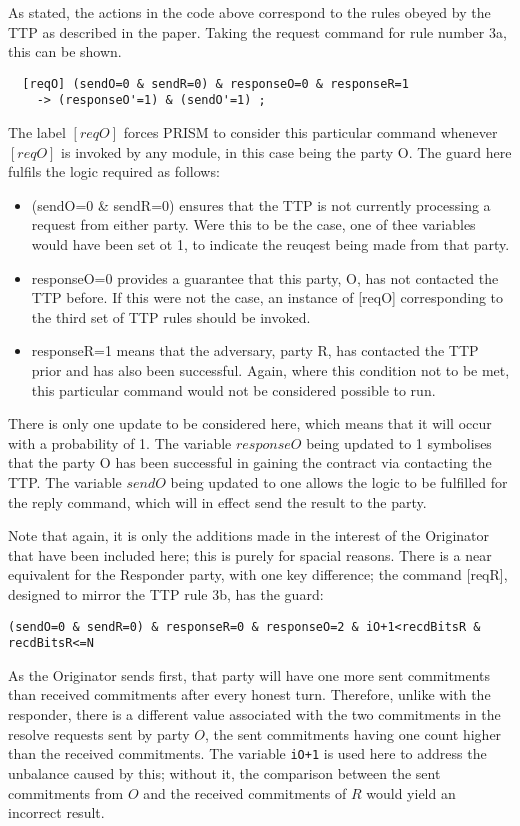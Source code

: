 \documentclass{l4proj}
\begin{document}
As stated, the actions in the code above correspond to the rules obeyed by the TTP as described in the paper. Taking the request command for rule number 3a, this can be shown.

\begin{lstlisting}
  [reqO] (sendO=0 & sendR=0) & responseO=0 & responseR=1 
    -> (responseO'=1) & (sendO'=1) ;
\end{lstlisting}
The label $[reqO]$ forces PRISM to consider this particular command whenever $[reqO]$ is invoked by any module, in this case being the party O. The guard here fulfils the logic required as follows:
\begin{itemize}
\item (sendO=0 \& sendR=0) ensures that the TTP is not currently processing a request from either party. Were this to be the case, one of thee variables would have been set ot 1, to indicate the reuqest being made from that party.
\item responseO=0 provides a guarantee that this party, O, has not contacted the TTP before. If this were not the case, an instance of [reqO] corresponding to the third set of TTP rules should be invoked.
\item responseR=1 means that the adversary, party R, has contacted the TTP prior and has also been successful. Again, where this condition not to be met, this particular command would not be considered possible to run.
\end{itemize}
There is only one update to be considered here, which means that it will occur with a probability of 1. The variable $responseO$ being updated to 1 symbolises that the party O has been successful in gaining the contract via contacting the TTP. The variable $sendO$ being updated to one allows the logic to be fulfilled for the reply command, which will in effect send the result to the party. 


 Note that again, it is only the additions made in the interest of the Originator that have been included here; this is purely for spacial reasons. There is a near equivalent for the Responder party, with one key difference; the command [reqR], designed to mirror the TTP rule 3b, has the guard:
\begin{lstlisting}
(sendO=0 & sendR=0) & responseR=0 & responseO=2 & iO+1<recdBitsR & recdBitsR<=N
\end{lstlisting}
 As the Originator sends first, that party will have one more sent commitments than received commitments after every honest turn. 
 Therefore, unlike with the responder, there is a different value associated with the two commitments in the resolve requests sent by party $O$, the sent commitments having one count higher than the received commitments. The variable {\tt iO+1} is used here to address the unbalance caused by this; without it, the comparison between the sent commitments from $O$ and the received commitments of $R$ would yield an incorrect result. 
\end{document}
